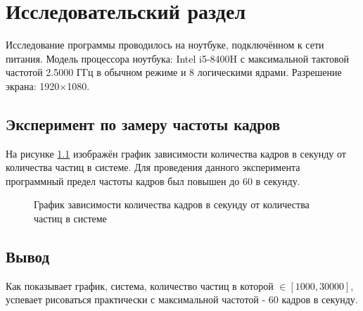 \chapter{Исследовательский раздел}
\label{cha:research}

Исследование программы проводилось на ноутбуке, подключённом к сети питания. Модель процессора ноутбука: Intel i5-8400H с максимальной тактовой частотой 2.5000 ГГц в обычном режиме и 8 логическими ядрами. Разрешение экрана: 1920$\times{}$1080.

\section{Эксперимент по замеру частоты кадров}

На рисунке \ref{img:plot} изображён график зависимости количества кадров в секунду от количества частиц в системе. Для проведения данного эксперимента программный предел частоты кадров был повышен до 60 в секунду.

\begin{figure}[H]
    \centering
    \caption{График зависимости количества кадров в секунду от количества частиц в системе}
    \label{img:plot}
\end{figure}

\section{Вывод}

Как показывает график, система, количество частиц в которой $\in [1000, 30000]$, успевает рисоваться практически с максимальной частотой - 60 кадров в секунду.

